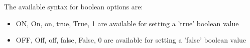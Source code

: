 The available syntax for boolean options are:

\begin{itemize}
    \item ON, On, on, true, True, 1 are available for setting a 'true' boolean value
    \item OFF, Off, off, false, False, 0 are available for setting a 'false' boolean value
\end{itemize}








